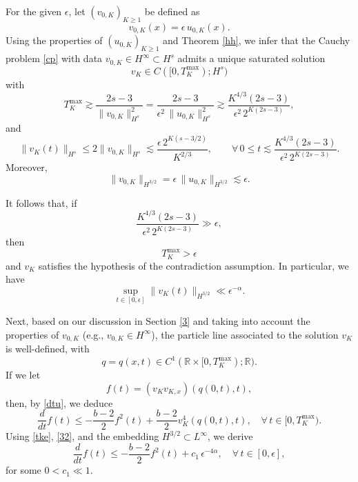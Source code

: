 \documentclass{amsart}
\newcommand{\R}{\mathbb R}
\begin{document}
For the given $\epsilon$, let $(v_{0,K})_{K\geq 1}$ be defined as
\begin{equation*}
v_{0, K}(x)=\epsilon \,u_{0,K}(x).
\end{equation*}
Using the properties of $(u_{0,K})_{K\geq 1}$ and Theorem \ref{hh}, we infer that the Cauchy problem \eqref{cp} with data $v_{0, K}\in H^\infty\subset H^s$ admits a unique saturated solution 
\[
v_K\in C([0, T^{\text{max}}_K); H^s)
\] 
with 
\[
T^{\text{max}}_K\gtrsim \frac{2s-3}{\|v_{0,K}\|^2_{H^s}}=  \frac{2s-3}{\epsilon^2\,\|u_{0,K}\|^2_{H^s}}\gtrsim \frac{K^{4/3}(2s-3)}{\epsilon^2 \,2^{K(2s-3)}},
\]
and
\[
\|v_K(t)\|_{H^s}\leq 2 \|v_{0,K}\|_{H^s}\lesssim \frac{\epsilon\, 2^{K(s-3/2)}}{K^{2/3}}, \qquad \forall\, 0\leq t\lesssim \frac{K^{4/3}(2s-3)}{\epsilon^2 \,2^{K(2s-3)}}.
\]
Moreover,
\begin{equation*}
\|v_{0,K}\|_{H^{3/2}}= \epsilon\,\|u_{0,K}\|_{H^{3/2}}\lesssim \epsilon.
\end{equation*}

It follows that, if 
\begin{equation}\boxed{
\frac{K^{4/3}(2s-3)}{\epsilon^2 \,2^{K(2s-3)}}\gg \epsilon,}\label{ke}
\end{equation}
then
\begin{equation}
T^{\text{max}}_K>\epsilon\label{tke}
\end{equation}
and $v_K$ satisfies the hypothesis of the contradiction assumption. In particular, we have
\begin{equation}
\sup_{t\in [0,\epsilon]} \|v_K(t)\|_{H^{3/2}}\ll \epsilon^{-\alpha}.\label{32}
\end{equation}

Next, based on our discussion in Section \ref{3} and taking into account the properties of $v_{0,K}$ (e.g., $v_{0, K}\in H^\infty$), the particle line associated to the solution $v_K$ is well-defined, with
\[
q=q(x,t)\in C^1(\R\times [0,T^{\text{max}}_K); \R).
\]
If we let
\[
f(t)=(v_K v_{K,x})(q(0,t), t),
\]
then, by \eqref{dtu}, we deduce
\begin{equation*}
\frac{d}{dt}f(t)\leq -\frac{b-2}{2}f^2(t) +\frac{b-2}{2}v_K^4(q(0,t), t),\quad \forall\,t\in [0,T_K^{\text{max}}).
\end{equation*}
Using \eqref{tke}, \eqref{32}, and the embedding $H^{3/2}\subset L^\infty$, we derive
\begin{equation}
\frac{d}{dt}f(t)\leq -\frac{b-2}{2}f^2(t) +c_1\,\epsilon^{-4\alpha},\quad \forall\,t\in [0,\epsilon],\label{ft}
\end{equation}
for some $0<c_1\ll 1$. 
\end{document}
